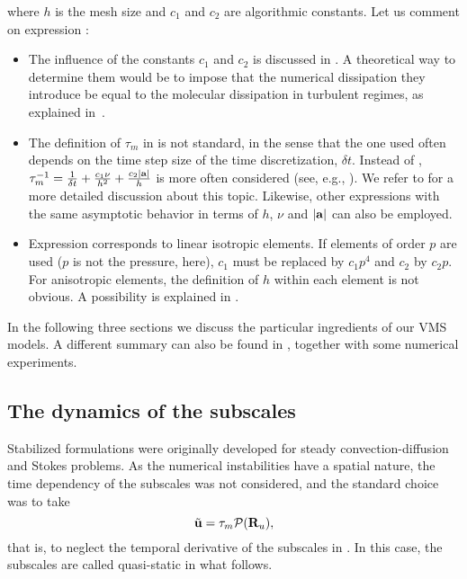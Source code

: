 where $h$ is the mesh size and $c_1$ and $c_2$ are algorithmic constants. Let us comment on expression :
\begin{itemize}
\item The influence of the constants $c_1$ and $c_2$ is discussed in . A theoretical way to determine them would be to impose that the numerical dissipation they introduce be equal to the molecular dissipation in turbulent regimes, as explained in~\cite{guasch-codina-13}. 
\item The definition of $\tau_m$ in  is not standard, in the sense that the one used often depends on the time step size of the time discretization, $\delta t$. Instead of , $\tau_m^{-1}=\frac{1}{\delta t} + \frac{c_1\nu}{h^2}+\frac{c_2|{\bf a}|}{h}$ is more often considered (see, e.g., \cite{Hsu2010,gamnitzer_time-dependent_2010}). We refer to  for a more detailed discussion about this topic. Likewise, other expressions with the same asymptotic behavior in terms of $h$, $\nu$ and $|{\bf a}|$ can also be employed.
\item Expression  corresponds to linear isotropic elements. If elements of order $p$ are used ($p$ is not the pressure, here), $c_1$ must be replaced by $c_1 p^4$ and $c_2$ by $c_2 p$. For anisotropic elements, the definition of $h$ within each element is not obvious. A possibility is explained in \cite{Principe2010}.
\end{itemize}

In the following three sections we discuss the particular ingredients of our VMS models. A different summary can also be found in \cite{Codina-chap-2011}, together with some numerical experiments. 

\subsection{The dynamics of the subscales}
\label{subsec-C2_dyn}
Stabilized formulations were originally developed for steady convection-diffusion \cite{Brooks_1982} and Stokes \cite{Douglas_1989,Hughes_1986_5} problems. As the numerical instabilities have a spatial nature, the time dependency of the subscales was not considered, and the standard choice \cite{Hughes2000,hughes_large_2001,bazilevs_variational_2007} was to take 
\begin{equation}
\label{eq-C2_static_sgs}
\tilde{{\bf u}}=\tau_m \mathcal{P}({\bf R}_u),
\end{equation}
that is, to neglect the temporal derivative of the subscales in . In this case, the subscales are called quasi-static in what follows.

